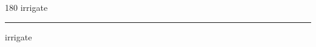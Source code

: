
\begin{frame}
\begin{center}
\begin{turn}{180}
{\fontsize{2.5cm}{1em}\selectfont irrigate}
\end{turn}
\vspace{1em}\par  
\hrule
\vspace{1em}\par  
{\fontsize{2.5cm}{1em}\selectfont irrigate}
\end{center}
\end{frame}
